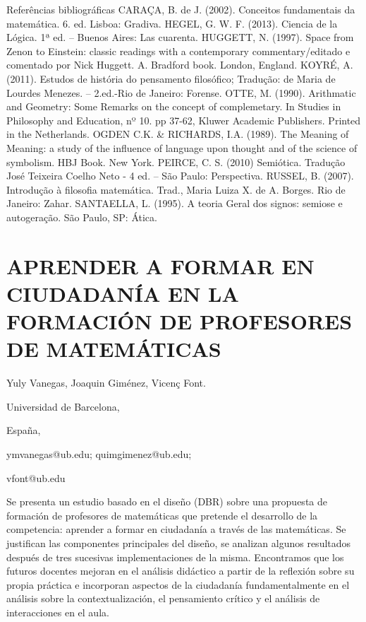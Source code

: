 Referências bibliográficas CARAÇA, B. de J. (2002). Conceitos fundamentais
da matemática. 6. ed. Lisboa: Gradiva. HEGEL, G. W. F. (2013). Ciencia
de la Lógica. 1ª ed. – Buenos Aires: Las cuarenta. HUGGETT, N. (1997).
Space from Zenon to Einstein: classic readings with a contemporary
commentary/editado e comentado por Nick Huggett. A. Bradford book.
London, England. KOYRÉ, A. (2011). Estudos de história do pensamento
filosófico; Tradução: de Maria de Lourdes Menezes. – 2.ed.-Rio de
Janeiro: Forense. OTTE, M. (1990). Arithmatic and Geometry: Some Remarks
on the concept of complemetary. In Studies in Philosophy and Education,
nº 10. pp 37-62, Kluwer Academic Publishers. Printed in the Netherlands.
OGDEN C.K. \& RICHARDS, I.A. (1989). The Meaning of Meaning: a study
of the influence of language upon thought and of the science of symbolism.
HBJ Book. New York. PEIRCE, C. S. (2010) Semiótica. Tradução José
Teixeira Coelho Neto - 4 ed. – São Paulo: Perspectiva. RUSSEL, B.
(2007). Introdução à filosofia matemática. Trad., Maria Luiza X. de
A. Borges. Rio de Janeiro: Zahar. SANTAELLA, L. (1995). A teoria Geral
dos signos: semiose e autogeração. São Paulo, SP: Ática.


\section{APRENDER A FORMAR EN CIUDADANÍA EN LA FORMACIÓN DE PROFESORES DE
MATEMÁTICAS}

\begin{datos}

Yuly Vanegas, Joaquin Giménez, Vicenç Font.

Universidad de Barcelona,

España,

ymvanegas@ub.edu; quimgimenez@ub.edu;

vfont@ub.edu

\end{datos}

Se presenta un estudio basado en el diseño (DBR) sobre una propuesta
de formación de profesores de matemáticas que pretende el desarrollo
de la competencia: aprender a formar en ciudadanía a través de las
matemáticas. Se justifican las componentes principales del diseño,
se analizan algunos resultados después de tres sucesivas implementaciones
de la misma. Encontramos que los futuros docentes mejoran en el análisis
didáctico a partir de la reflexión sobre su propia práctica e incorporan
aspectos de la ciudadanía fundamentalmente en el análisis sobre la
contextualización, el pensamiento crítico y el análisis de interacciones
en el aula.


